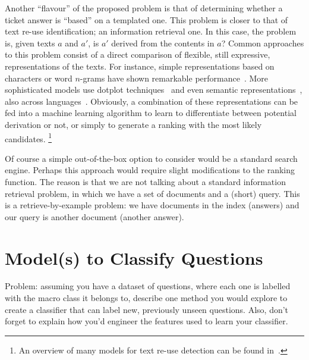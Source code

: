 \documentclass[11pt]{article}
\begin{document}
Another ``flavour'' of the proposed problem is that of determining whether a 
ticket answer is ``based'' on a templated one. This problem is closer to that of 
text re-use identification; an information retrieval one.  
In this case, the problem is, given texts $a$ and $a'$, is $a'$ derived from the 
contents in $a$? Common approaches to this problem consist of a direct 
comparison of flexible, still expressive, representations of the texts. For 
instance, simple representations based on characters or word $n$-grams have 
shown remarkable performance~\cite{Lyon:04}. More sophisticated models use 
dotplot techniques~\cite{Basile:2009} and even semantic 
representations~\cite{Gabrilovich:07}, also across languages~\cite{Potthast:11}. 
Obviously, a combination of these representations can be fed into a machine 
learning algorithm to learn to differentiate between potential derivation or 
not, or simply to generate a ranking with the most likely candidates.%
\footnote{An overview of many models for text re-use detection can be found 
in~\cite{BarronPhd:12}.}

Of course a simple out-of-the-box option to consider would be a standard search 
engine. Perhaps this approach would require slight modifications to the ranking 
function. The reason is that we are not talking about a standard information 
retrieval problem, in which we have a set of documents and a (short) query. This 
is a retrieve-by-example problem: we have documents in the index (answers) and 
our query is another document (another answer). 


\section{Model(s) to Classify Questions}

Problem: assuming you have a dataset of questions, where each one is labelled 
with the macro class it belongs to, describe one method you would explore to 
create a classifier that can label new, previously unseen questions. Also, don't 
forget to explain how you'd engineer the features used to learn your classifier.
\medskip
\end{document}
